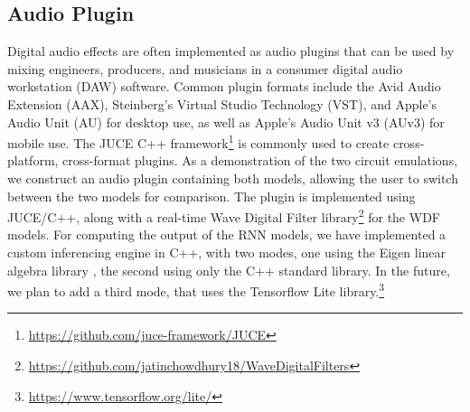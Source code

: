 \documentclass[twoside,a4paper]{article}
\begin{document}
\subsection{Audio Plugin}
Digital audio effects are often implemented as audio plugins that
can be used by mixing engineers, producers, and musicians in a
consumer digital audio workstation (DAW) software. Common plugin
formats include the Avid Audio Extension (AAX), Steinberg's Virtual
Studio Technology (VST), and Apple's Audio Unit (AU) for desktop use,
as well as Apple's Audio Unit v3 (AUv3) for mobile use. The JUCE C++
framework\footnote{\url{https://github.com/juce-framework/JUCE}} is
commonly used to create cross-platform, cross-format plugins.
\newline\newline
As a demonstration of the two circuit emulations, we construct an audio
plugin containing both models, allowing the user to switch
between the two models for comparison. The plugin is implemented using
JUCE/C++, along with a real-time Wave Digital Filter
library\footnote{\url{https://github.com/jatinchowdhury18/WaveDigitalFilters}}
for the WDF models. For computing the output of the RNN models, we have
implemented a custom inferencing engine in C++, with two modes, one using
the Eigen linear algebra library \cite{eigenweb}, the second using only
the C++ standard library. In the future, we plan to add a third mode, that
uses the Tensorflow Lite library.\footnote{\url{https://www.tensorflow.org/lite/}}
\end{document}
